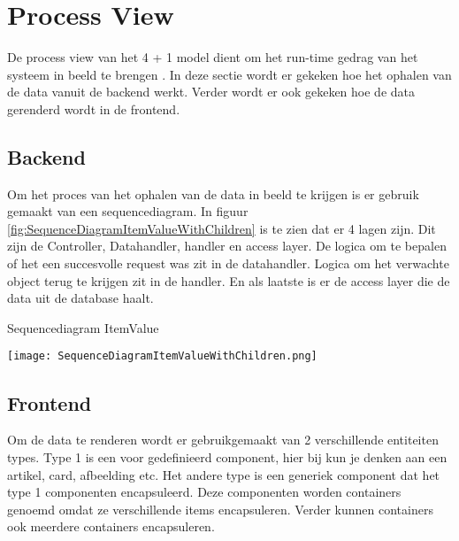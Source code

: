\section{Process View}
De process view van het 4 + 1 model dient om het run-time gedrag van het systeem in beeld te brengen \parencite{4+1ViewModelPaper}.
In deze sectie wordt er gekeken hoe het ophalen van de data vanuit de backend werkt.
Verder wordt er ook gekeken hoe de data gerenderd wordt in de frontend.

\subsection{Backend}
Om het proces van het ophalen van de data in beeld te krijgen is er gebruik gemaakt van een sequencediagram.
In figuur \ref{fig:SequenceDiagramItemValueWithChildren} is te zien dat er 4 lagen zijn. 
Dit zijn de Controller, Datahandler, handler en access layer.
De logica om te bepalen of het een succesvolle request was zit in de datahandler.
Logica om het verwachte object terug te krijgen zit in de handler.
En als laatste is er de access layer die de data uit de database haalt.

\whitespace
\begin{graphic}
    \captionsetup{type=figure}
    \caption{Sequencediagram ItemValue}
    \texttt{[image: SequenceDiagramItemValueWithChildren.png]}
    \label{fig:SequenceDiagramItemValueWithChildren}
\end{graphic}

%

\newpage
\subsection{Frontend}

Om de data te renderen wordt er gebruikgemaakt van 2 verschillende entiteiten types.
Type 1 is een voor gedefinieerd component, hier bij kun je denken aan een artikel, card, afbeelding etc.
Het andere type is een generiek component dat het type 1 componenten encapsuleerd.
Deze componenten worden containers genoemd omdat ze verschillende items encapsuleren.
Verder kunnen containers ook meerdere containers encapsuleren.


